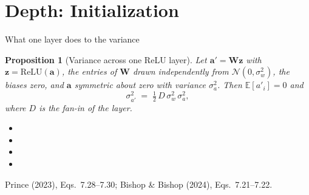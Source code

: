 \documentclass[aspectratio=169, 11pt]{beamer}
\newtheorem{propx}[theorem]{Proposition}
\newcommand{\srcline}[1]{%
  \par\vspace{0.25em}%
  {\scriptsize\color{mcMuted}\hfill #1\par}}
\newcommand{\src}[3]{}      %
\begin{document}
\section{Depth: Initialization}

\begin{frame}{What one layer does to the variance}
  \src{prince2023}{equation}{7.28-7.30}
  \src{prince2023}{section}{7.5.1}
  \src{bishop2024}{equation}{7.21-7.22}
  \src{bishop2024}{section}{7.2.5}
  \vspace{-0.25em}
  \begin{propx}[Variance across one ReLU layer]\label{th:var}
    \small
    Let $\mathbf{a}' = \mathbf{W} \mathbf{z}$ with $\mathbf{z} = \mathrm{ReLU}(\mathbf{a})$, the entries of $\mathbf{W}$ drawn
    independently from $\mathcal{N}(0, \sigma_w^2)$, the biases zero,
    and $\mathbf{a}$ symmetric about zero with variance $\sigma_a^2$. Then
    $\mathbb{E}[a'_i] = 0$ and
    \[
      \sigma_{a'}^2 \;=\; \tfrac12\, D\, \sigma_w^2\, \sigma_a^2 ,
    \]
    where $D$ is the fan-in of the layer.
  \end{propx}
  \vspace{0.05em}
  {\footnotesize
  \begin{itemize}\itemsep0.26em
    \item {}
    \item {}
    \item {}
    \item {}
  \end{itemize}}
  \vspace{-0.4em}
  \srcline{Prince (2023), Eqs.~7.28--7.30; Bishop \& Bishop (2024),
  Eqs.~7.21--7.22.}
\end{frame}
\end{document}
